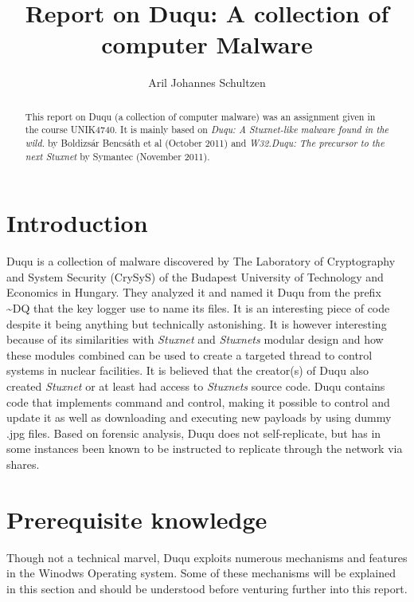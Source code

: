 \documentclass[11pt,english,a4paper]{report}
\title{Report on Duqu: A collection of computer Malware}
\author{Aril Johannes Schultzen}
\begin{document}
\maketitle
\thispagestyle{empty}
\setcounter{page}{0}
\tableofcontents
\thispagestyle{empty}
\setcounter{page}{0}
\thispagestyle{empty}
\setcounter{page}{0}
\clearpage
\setcounter{page}{1}

\begin{abstract}
This report on Duqu (a collection of computer malware) was an assignment given in the course UNIK4740. It is mainly based on \textit{Duqu: A Stuxnet-like malware found in the wild.}\cite{DUQU_BUD} by Boldizsár Bencsáth et al (October 2011) and \textit{W32.Duqu: The precursor to the next Stuxnet}\cite{DUQU_SYMANTEC} by Symantec (November 2011).
\end{abstract}
\newpage

\chapter{Introduction}
Duqu is a collection of malware discovered by The Laboratory of Cryptography and System Security (CrySyS) of the Budapest University of Technology and Economics in Hungary. They analyzed it and named it Duqu from the prefix \textasciitilde DQ that the key logger use to name its files. It is an interesting piece of code despite it being anything but technically astonishing. It is however interesting because of its similarities with \textit{Stuxnet} and \textit{Stuxnets} modular design and how these modules combined can be used to create a targeted thread to control systems in nuclear facilities. It is believed that the creator(s) of Duqu also created \textit{Stuxnet} or at least had access to \textit{Stuxnets} source code. Duqu contains code that implements command and control, making it possible to control and update it as well as downloading and executing new payloads by using dummy .jpg files. Based on forensic analysis, Duqu does not self-replicate, but has in some instances been known to be instructed to replicate through the network via shares. \cite{DUQU_SYMANTEC}

\chapter{Prerequisite knowledge}
Though not a technical marvel, Duqu exploits numerous mechanisms and features in the Winodws Operating system. Some of these mechanisms will be explained in this section and should be understood before venturing further into this report.
\end{document}
